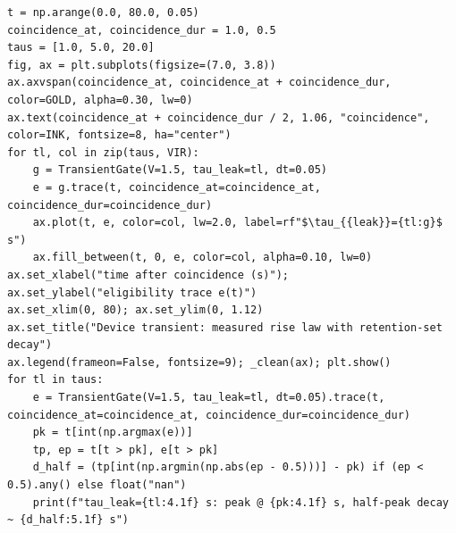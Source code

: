 \begin{lstlisting}[caption={01\_trace\_and\_credit\_window.ipynb code cell 2},label={lst:mrl-nb-01-trace-and-credit-window-2}]
t = np.arange(0.0, 80.0, 0.05)
coincidence_at, coincidence_dur = 1.0, 0.5
taus = [1.0, 5.0, 20.0]
fig, ax = plt.subplots(figsize=(7.0, 3.8))
ax.axvspan(coincidence_at, coincidence_at + coincidence_dur, color=GOLD, alpha=0.30, lw=0)
ax.text(coincidence_at + coincidence_dur / 2, 1.06, "coincidence", color=INK, fontsize=8, ha="center")
for tl, col in zip(taus, VIR):
    g = TransientGate(V=1.5, tau_leak=tl, dt=0.05)
    e = g.trace(t, coincidence_at=coincidence_at, coincidence_dur=coincidence_dur)
    ax.plot(t, e, color=col, lw=2.0, label=rf"$\tau_{{leak}}={tl:g}$ s")
    ax.fill_between(t, 0, e, color=col, alpha=0.10, lw=0)
ax.set_xlabel("time after coincidence (s)"); ax.set_ylabel("eligibility trace e(t)")
ax.set_xlim(0, 80); ax.set_ylim(0, 1.12)
ax.set_title("Device transient: measured rise law with retention-set decay")
ax.legend(frameon=False, fontsize=9); _clean(ax); plt.show()
for tl in taus:
    e = TransientGate(V=1.5, tau_leak=tl, dt=0.05).trace(t, coincidence_at=coincidence_at, coincidence_dur=coincidence_dur)
    pk = t[int(np.argmax(e))]
    tp, ep = t[t > pk], e[t > pk]
    d_half = (tp[int(np.argmin(np.abs(ep - 0.5)))] - pk) if (ep < 0.5).any() else float("nan")
    print(f"tau_leak={tl:4.1f} s: peak @ {pk:4.1f} s, half-peak decay ~ {d_half:5.1f} s")
\end{lstlisting}

